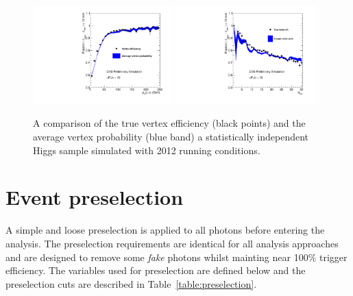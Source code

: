 \begin{figure}
  \includegraphics[width=0.48\textwidth]{analysis_comps/plots/vertex_bdt_prob_efficiency_pt.pdf}
  \includegraphics[width=0.48\textwidth]{analysis_comps/plots/vertex_bdt_prob_efficiency_nvtx.pdf}
  \caption{A comparison of the true vertex efficiency (black points) and the average vertex probability (blue band) a statistically independent \MC Higgs sample simulated with 2012 running conditions.}
  \label{fig:vertex_bdt_prob_efficiency}
\end{figure}

\section{Event preselection}
\label{sec:photon_presel}

A simple and loose preselection is applied to all photons before entering the analysis. The preselection requirements are identical for all analysis approaches and are designed to remove some \emph{fake} photons whilst mainting near 100\% trigger efficiency. The variables used for preselection are defined below and the preselection cuts are described in Table~\ref{table:preselection}.


